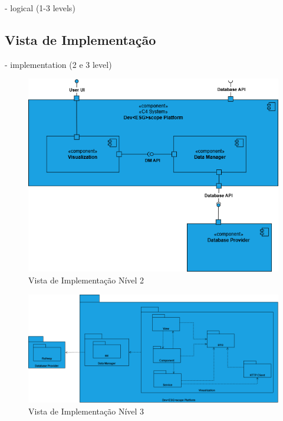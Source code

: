 - logical (1-3 levels)


\subsection{Vista de Implementação}
- implementation (2 e 3 level)



\begin{figure}[H]
    \centering
    \includegraphics[width=5in,keepaspectratio]{frontmatter/assets/diagrams/Development View/Implementation View Lv2.drawio.png}
    \caption{Vista de Implementação Nível 2}
    \label{fig:development_view_lv2}
\end{figure}


\begin{figure}[H]
    \centering
    \includegraphics[width=6.5in,keepaspectratio]{frontmatter/assets/diagrams/Development View/Implementation Lv3.drawio.png}
    \caption{Vista de Implementação Nível 3}
    \label{fig:development_view_lv3}
\end{figure}


